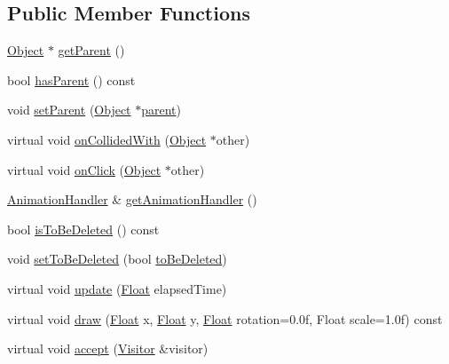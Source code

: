 \subsection*{Public Member Functions}
\begin{DoxyCompactItemize}
\item 
\hyperlink{classZeta_1_1Object}{Object} $\ast$ \hyperlink{classZeta_1_1ChildObject_af82270dd9f75f27022a574e92d1b02aa}{get\+Parent} ()
\item 
bool \hyperlink{classZeta_1_1ChildObject_ab703ec20290946ca573c3db862e438a8}{has\+Parent} () const 
\item 
void \hyperlink{classZeta_1_1ChildObject_a4bb3e87da8660d667a433f9fb9017bda}{set\+Parent} (\hyperlink{classZeta_1_1Object}{Object} $\ast$\hyperlink{classZeta_1_1ChildObject_aca8fcd19fdb0291c58a21cd91046e4aa}{parent})
\item 
virtual void \hyperlink{classZeta_1_1ChildObject_ad4832e3d30aff763d06ea631df01ca28}{on\+Collided\+With} (\hyperlink{classZeta_1_1Object}{Object} $\ast$other)
\item 
virtual void \hyperlink{classZeta_1_1ChildObject_af410405ced53e5719996157aadf4154e}{on\+Click} (\hyperlink{classZeta_1_1Object}{Object} $\ast$other)
\item 
\hyperlink{classZeta_1_1AnimationHandler}{Animation\+Handler} \& \hyperlink{classZeta_1_1ChildObject_a8f3255571ff4e3055920c6c73531c071}{get\+Animation\+Handler} ()
\item 
bool \hyperlink{classZeta_1_1ChildObject_ab10b86507072e36092b5e1ee45e8bda9}{is\+To\+Be\+Deleted} () const 
\item 
void \hyperlink{classZeta_1_1ChildObject_a93a9382628178e787a3d12a86ae328c6}{set\+To\+Be\+Deleted} (bool \hyperlink{classZeta_1_1ChildObject_aefd99848653386c7e7d98d2f9d66f25d}{to\+Be\+Deleted})
\item 
virtual void \hyperlink{classZeta_1_1ChildObject_a3cdc2e1198344a027e48328e5b8fc018}{update} (\hyperlink{namespaceZeta_a1e0a1265f9b3bd3075fb0fabd39088ba}{Float} elapsed\+Time)
\item 
virtual void \hyperlink{classZeta_1_1ChildObject_a561389a9afe2cac7363ead7234a79a87}{draw} (\hyperlink{namespaceZeta_a1e0a1265f9b3bd3075fb0fabd39088ba}{Float} x, \hyperlink{namespaceZeta_a1e0a1265f9b3bd3075fb0fabd39088ba}{Float} y, \hyperlink{namespaceZeta_a1e0a1265f9b3bd3075fb0fabd39088ba}{Float} rotation=0.\+0f, Float scale=1.\+0f) const 
\item 
virtual void \hyperlink{classZeta_1_1ChildObject_a1727027b77076f5bb59df22f57a148ec}{accept} (\hyperlink{classZeta_1_1Visitor}{Visitor} \&visitor)

\end{DoxyCompactItemize}
